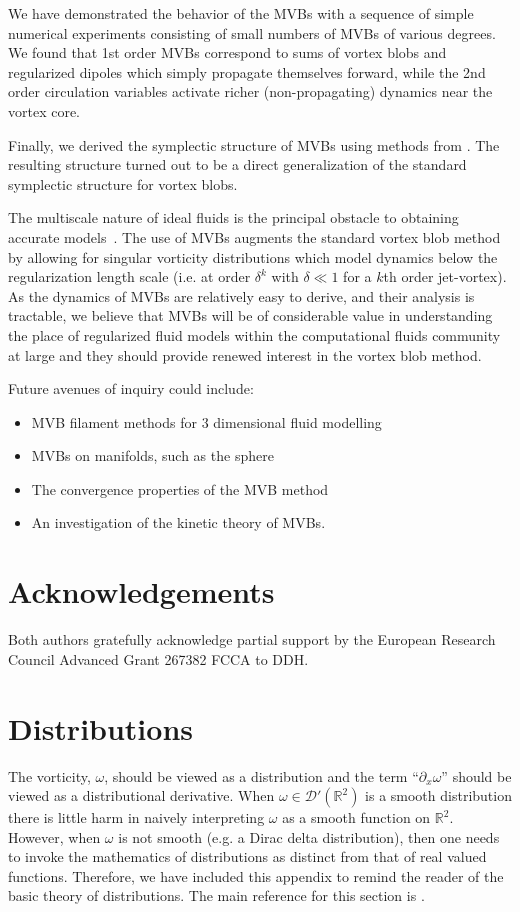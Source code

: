 \documentclass[12pt]{amsart}
\newcommand{\R}{\ensuremath{\mathbb{R}}}
\theoremstyle{remark}
\begin{document}
We have demonstrated the behavior of the MVBs with a sequence of simple numerical experiments consisting of small numbers of MVBs of various degrees.
We found that 1st order MVBs correspond to sums of vortex blobs and regularized dipoles which simply propagate themselves forward, while the 2nd order circulation variables activate richer (non-propagating) dynamics near the vortex core.

Finally, we derived the symplectic structure of MVBs using methods from  \cite{MarsdenWeinstein1983}.
The resulting structure turned out to be a direct generalization of the standard
symplectic structure for vortex blobs.

The multiscale nature of ideal fluids is the principal obstacle to obtaining accurate models~\cite[Ch. 3]{Chorin1994}.
The use of MVBs augments the standard vortex blob method by allowing for singular vorticity distributions which model dynamics below the regularization length scale (i.e. at order $\delta^k$ with $\delta\ll1$ for a $k$th order jet-vortex). As the dynamics of MVBs are relatively easy to derive, and their analysis is tractable, we believe that MVBs will be of considerable value in understanding the place of regularized fluid models within the computational fluids community at large
and they should provide renewed interest in the vortex blob method.

Future avenues of inquiry could include:
\begin{itemize}
	\item MVB filament methods for $3$ dimensional fluid modelling
	\item MVBs on manifolds, such as the sphere
	\item The convergence properties of the MVB method
	\item An investigation of the kinetic theory of MVBs.
\end{itemize}

\section{Acknowledgements}
Both authors gratefully acknowledge partial support by the European Research
Council Advanced Grant 267382 FCCA to DDH.

\appendix

\section{Distributions}
\label{sec:distributions}
The vorticity, $\omega$, should be viewed as a distribution
and the term ``$\partial_x \omega$'' should be viewed
as a distributional derivative.
When $\omega \in \mathcal{D}'(\R^2)$ is a smooth distribution there is little harm in naively interpreting $\omega$ as a smooth function on $\R^2$.
However, when $\omega$ is not smooth (e.g. a Dirac delta distribution),
then one needs to invoke the mathematics of distributions
as distinct from that of real valued functions.
Therefore, we have included this appendix to remind the reader of the basic theory of distributions.
The main reference for this section is \cite{Hormander2003}.
\end{document}
